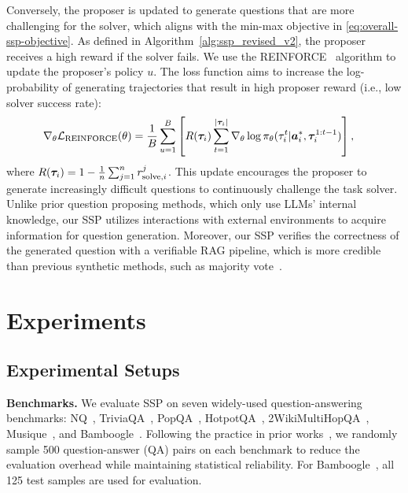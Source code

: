 \documentclass[10pt, a4paper, logo]{googledeepmind} %
\begin{document}
Conversely, the proposer is updated to generate questions that are more challenging for the solver, which aligns with the min-max objective in \eqref{eq:overall-ssp-objective}. As defined in Algorithm~\ref{alg:ssp_revised_v2}, the proposer receives a high reward if the solver fails. We use the REINFORCE~\citep{williams1992simple} algorithm to update the proposer's policy $u$. The loss function aims to increase the log-probability of generating trajectories that result in high proposer reward (i.e., low solver success rate):
\begin{align}
    \nabla_\theta {\mathcal{L}}_\text{REINFORCE} (\theta) &= \frac{1}{B} \sum_{u=1}^B  \left[ R({\bm{\tau}}_i) \sum_{t=1}^{|{\bm{\tau}}_i|} \nabla_\theta \log \pi_\theta(\tau_{i}^{t}|{\bm{a}}^*_i, {\bm{\tau}}_{i}^{1:t-1}) \right], 
    \label{eq:reinforce_proposer}
\end{align}
 where $R({\bm{\tau}}_i) =  1 - \frac{1}{n} \sum_{j=1}^n r_{\text{solve},i}^j$.
This update encourages the proposer to generate increasingly difficult questions to continuously challenge the task solver. Unlike prior question proposing methods, which only use LLMs' internal knowledge, our SSP utilizes interactions with external environments to acquire information for question generation. Moreover, our SSP verifies the correctness of the generated question with a verifiable RAG pipeline, which is more credible than previous synthetic methods, such as majority vote~\citep{huang_r-zero_2025}.




\section{Experiments}
\label{exp}
\vspace{-1mm}
\subsection{Experimental Setups}
\label{sec:exp_setup}
\vspace{-1mm}
\textbf{Benchmarks.} We evaluate SSP on seven widely-used question-answering benchmarks: NQ~\citep{kwiatkowski2019natural}, TriviaQA~\citep{joshi2017triviaqa}, PopQA~\citep{mallen2022not}, HotpotQA~\citep{yang2018hotpotqa}, 2WikiMultiHopQA~\citep{ho2020constructing}, Musique~\citep{trivedi2022musique}, and Bamboogle~\citep{press2022measuring}. Following the practice in prior works~\citep{sun2025simpledeepsearcher,sun2025zerosearch,zhao2025rsearch,gao2025asearcher,deng_atom-searcher_2025,tan_hiersearch_2025}, we randomly sample 500 question-answer (QA) pairs on each benchmark to reduce the evaluation overhead while maintaining statistical reliability.
For Bamboogle~\citep{press2022measuring}, all 125 test samples are used for evaluation.
\end{document}
